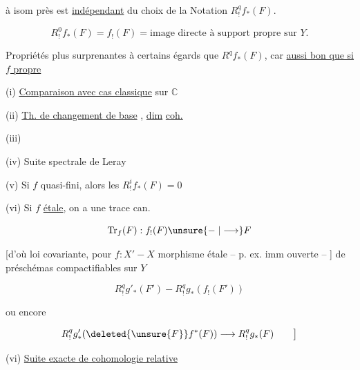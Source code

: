 à isom près est \uline{indépendant} du choix de la  Notation $R^q_! f_*(F)$.

\[
R^0_! f_*(F)=f_!(F)=\text{image directe à support propre sur }Y.
\]

 Propriétés plus surprenantes à certains égards que $R^q f_*(F)$, car \uline{aussi bon que si $f$ propre}

(i) \uline{Comparaison avec cas classique} sur $\mathbb C$

(ii) \uline{Th. de changement de base} , \uline{dim} \uline{coh.}

(iii) \uline{}

(iv) Suite spectrale de Leray

(v) Si $f$ quasi-fini, alors les $R^i_! f_*(F)=0$

(vi) Si $f$ \uline{étale}, on a une trace can.

\[
\mathrm{Tr}_f(F):f_!(F)\unsure{\mathrel{-}|\longrightarrow}F
\]

[d'où loi covariante, pour $f:X'\mathrel{-}X$ morphisme étale -- p. ex. imm ouverte -- ] de préschémas compactifiables sur $Y$

\[
R^q_!g'_*(F')\mathrel{-}R^q_!g_*(f_!(F'))
\]

ou encore

\[
R^q_!g'_*(\deleted{\unsure{F}}f^*(F))\longrightarrow R^q_!g_*(F)\qquad\big]
\]

(vi) \uline{Suite exacte de cohomologie relative}

